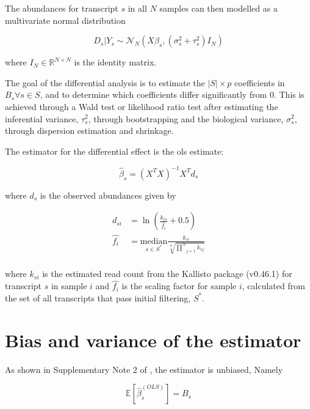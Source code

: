 The abundances for transcript $s$ in all $N$ samples can then modelled as a multivariate normal distribution

\begin{equation}
  D_{s} | Y_{s} \sim \mathcal{N}_N(X \beta_s, (\sigma_s^2 + \tau_s^2)I_{N})
\end{equation}

where $I_N \in \mathbb{R}^{N \times N}$ is the identity matrix.

The goal of the differential analysis is to estimate the $|S| \times p$ coefficients in $B_s \forall s \in S$, and to determine which coefficients differ significantly from 0.
This is achieved through a Wald test or likelihood ratio test after estimating the inferential variance, $\tau_s^2$, through bootstrapping and the biological variance, $\sigma_s^2$, through dispersion estimation and shrinkage.

The estimator for the differential effect is the \gls{ols} estimate:

\begin{equation*}
  \hat{\beta}_s = (X^TX)^{-1} X^T d_s
\end{equation*}

where $d_s$ is the observed abundances given by

\begin{align*}
  d_{si} &= \ln \left(\frac{k_{si}}{\hat{f_i}} + 0.5 \right) \\
  \hat{f_i} &= \underset{s \in S^*}{\mathrm{median}} \frac{k_{si}}{\sqrt[N]{\underset{j = 1}{\overset{N}{\prod }}k_{sj}}} \\
\end{align*}


where $k_{si}$ is the estimated read count from the Kallisto package (v0.46.1) \cite{brayNearoptimalProbabilisticRNAseq2016} for transcript $s$ in sample $i$ and $\hat{f_i}$ is the scaling factor for sample $i$, calculated from the set of all transcripts that pass initial filtering, $S^*$.

\section{Bias and variance of the  estimator}

As shown in Supplementary Note 2 of \cite[REF][]{pimentelDifferentialAnalysisRNAseq2017}, the estimator is unbiased, Namely

\begin{equation}
  \mathbb{E} \left[ \hat{\beta}_s^{(OLS)} \right] = B_s
\end{equation}


